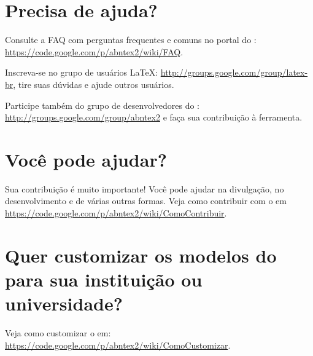 \section{Precisa de ajuda?}

Consulte a FAQ com perguntas frequentes e comuns no portal do \abnTeX{}:
\url{https://code.google.com/p/abntex2/wiki/FAQ}.

Inscreva-se no grupo de usuários \LaTeX{}:
\url{http://groups.google.com/group/latex-br}, tire suas dúvidas e ajude
outros usuários.

Participe também do grupo de desenvolvedores do \abnTeX{}:
\url{http://groups.google.com/group/abntex2} e faça sua contribuição à
ferramenta.

\section{Você pode ajudar?}

Sua contribuição é muito importante! Você pode ajudar na divulgação, no
desenvolvimento e de várias outras formas. Veja como contribuir com o \abnTeX{}
em \url{https://code.google.com/p/abntex2/wiki/ComoContribuir}.

\section{Quer customizar os modelos do \texorpdfstring{\newline}{}\abnTeX{} para
    sua instituição ou universidade?}

Veja como customizar o \abnTeX{} em:
\url{https://code.google.com/p/abntex2/wiki/ComoCustomizar}.
